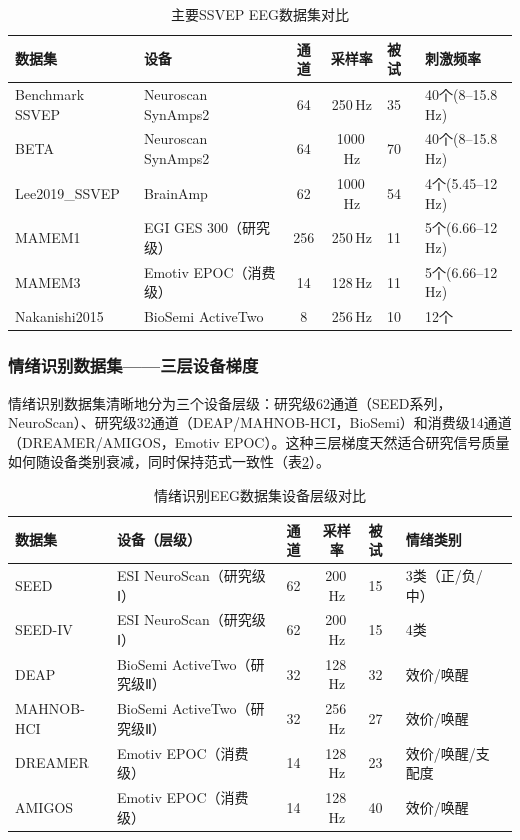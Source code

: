 \documentclass[12pt, a4paper]{article}
\begin{document}
\begin{table}[H]
\centering
\caption{主要SSVEP EEG数据集对比}
\label{tab:ssvep_datasets}
\small
\begin{tabularx}{\textwidth}{p{3.0cm}p{2.8cm}ccp{0.6cm}X}
\toprule
\textbf{数据集} & \textbf{设备} & \textbf{通道} & \textbf{采样率} & \textbf{被试} & \textbf{刺激频率} \\
\midrule
Benchmark SSVEP \citep{WangBenchmarkSSVEP2016} & Neuroscan SynAmps2 & 64 & 250\,Hz & 35 & 40个(8--15.8\,Hz) \\
\addlinespace
BETA \citep{BETA2020} & Neuroscan SynAmps2 & 64 & 1000\,Hz & 70 & 40个(8--15.8\,Hz) \\
\addlinespace
Lee2019\_SSVEP \citep{Lee2019OpenBMI} & BrainAmp & 62 & 1000\,Hz & 54 & 4个(5.45--12\,Hz) \\
\addlinespace
MAMEM1 \citep{MAMEM2016} & EGI GES 300（研究级） & 256 & 250\,Hz & 11 & 5个(6.66--12\,Hz) \\
\addlinespace
MAMEM3 \citep{MAMEM2016} & Emotiv EPOC（消费级） & 14 & 128\,Hz & 11 & 5个(6.66--12\,Hz) \\
\addlinespace
Nakanishi2015 & BioSemi ActiveTwo & 8 & 256\,Hz & 10 & 12个 \\
\bottomrule
\end{tabularx}
\end{table}

\subsubsection{情绪识别数据集——三层设备梯度}

情绪识别数据集清晰地分为三个设备层级：研究级62通道（SEED系列，NeuroScan）、研究级32通道（DEAP/MAHNOB-HCI，BioSemi）和消费级14通道（DREAMER/AMIGOS，Emotiv EPOC）。这种三层梯度天然适合研究信号质量如何随设备类别衰减，同时保持范式一致性（表\ref{tab:emotion_datasets}）。

\begin{table}[H]
\centering
\caption{情绪识别EEG数据集设备层级对比}
\label{tab:emotion_datasets}
\small
\begin{tabularx}{\textwidth}{p{2.5cm}p{3.2cm}ccp{0.6cm}XX}
\toprule
\textbf{数据集} & \textbf{设备（层级）} & \textbf{通道} & \textbf{采样率} & \textbf{被试} & \textbf{情绪类别} \\
\midrule
SEED \citep{Zheng2015SEED} & ESI NeuroScan（研究级Ⅰ） & 62 & 200\,Hz & 15 & 3类（正/负/中） \\
\addlinespace
SEED-IV \citep{SEEDIV2018} & ESI NeuroScan（研究级Ⅰ） & 62 & 200\,Hz & 15 & 4类 \\
\addlinespace
DEAP \citep{Koelstra2012DEAP} & BioSemi ActiveTwo（研究级Ⅱ） & 32 & 128\,Hz & 32 & 效价/唤醒 \\
\addlinespace
MAHNOB-HCI & BioSemi ActiveTwo（研究级Ⅱ） & 32 & 256\,Hz & 27 & 效价/唤醒 \\
\addlinespace
DREAMER \citep{DREAMER2018} & Emotiv EPOC（消费级） & 14 & 128\,Hz & 23 & 效价/唤醒/支配度 \\
\addlinespace
AMIGOS & Emotiv EPOC（消费级） & 14 & 128\,Hz & 40 & 效价/唤醒 \\
\bottomrule
\end{tabularx}
\end{table}
\end{document}
